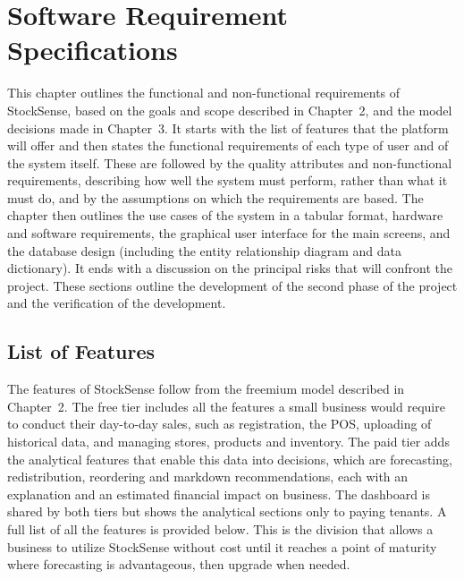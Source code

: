 \documentclass{StockSense}
\begin{document}

\chapter{Software Requirement Specifications}

This chapter outlines the functional and non-functional requirements of StockSense, based on the goals and scope described in Chapter~2, and the model decisions made in Chapter~3. It starts with the list of features that the platform will offer and then states the functional requirements of each type of user and of the system itself. These are followed by the quality attributes and non-functional requirements, describing how well the system must perform, rather than what it must do, and by the assumptions on which the requirements are based. The chapter then outlines the use cases of the system in a tabular format, hardware and software requirements, the graphical user interface for the main screens, and the database design (including the entity relationship diagram and data dictionary). It ends with a discussion on the principal risks that will confront the project. These sections outline the development of the second phase of the project and the verification of the development.

\section{List of Features}

The features of StockSense follow from the freemium model described in Chapter~2. The free tier includes all the features a small business would require to conduct their day-to-day sales, such as registration, the POS, uploading of historical data, and managing stores, products and inventory. The paid tier adds the analytical features that enable this data into decisions, which are forecasting, redistribution, reordering and markdown recommendations, each with an explanation and an estimated financial impact on business. The dashboard is shared by both tiers but shows the analytical sections only to paying tenants. A full list of all the features is provided below. This is the division that allows a business to utilize StockSense without cost until it reaches a point of maturity where forecasting is advantageous, then upgrade when needed.
\end{document}
